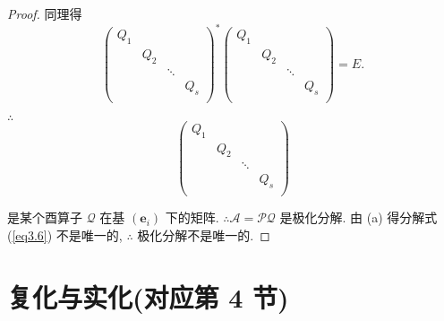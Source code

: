 \documentclass[color=black,device=normal,lang=cn,mode=geye]{elegantnote}
\begin{document}
\begin{proof}
    同理得
    \[\begin{pmatrix}
        Q_1 \\
        & Q_2 \\
        && \ddots \\
        &&& Q_s \\
    \end{pmatrix}^*\begin{pmatrix}
        Q_1 \\
        & Q_2 \\
        && \ddots \\
        &&& Q_s \\
    \end{pmatrix}=E.\]

    $\therefore$
    \[\begin{pmatrix}
        Q_1 \\
        & Q_2 \\
        && \ddots \\
        &&& Q_s \\
    \end{pmatrix}\]

    是某个酉算子 $\mathcal{Q}$ 在基 $(\boldsymbol{e}_i)$ 下的矩阵. $\therefore\mathcal{A}=\mathcal{PQ}$ 是极化分解. 由 (a) 得分解式 (\ref{eq3.6}) 不是唯一的, $\therefore$ 极化分解不是唯一的.
\end{proof}
\section{复化与实化(对应第 4 节)}
\end{document}
